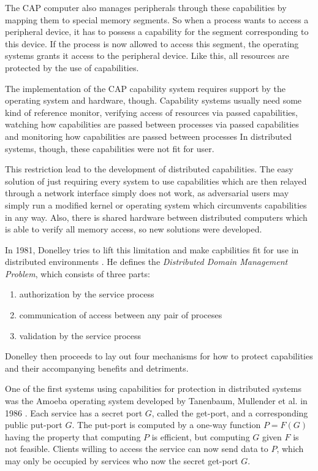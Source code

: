 The CAP computer also manages peripherals through these capabilities by mapping them to special memory segments.
So when a process wants to access a peripheral device, it has to possess a capability for the segment corresponding to this device.
If the process is now allowed to access this segment, the operating systems grants it access to the peripheral device.
Like this, all resources are protected by the use of capabilities.

The implementation of the CAP capability system requires support by the operating system and hardware, though.
Capability systems usually need some kind of reference monitor, verifying access of resources via passed capabilities, watching how capabilities are passed between processes via passed capabilities and monitoring how capabilities are passed between processes
In distributed systems, though, these capabilities were not fit for user.

This restriction lead to the development of distributed capabilities.
The easy solution of just requiring every system to use capabilities which are then relayed through a network interface simply does not work, as adversarial users may simply run a modified kernel or operating system which circumvents capabilities in any way.
Also, there is shared hardware between distributed computers which is able to verify all memory access, so new solutions were developed.

In 1981, Donelley tries to lift this limitation and make capbilities fit for use in distributed environments \cite{donnelley1981managing}.
He defines the \emph{Distributed Domain Management Problem}, which consists of three parts:
\begin{enumerate}
    \item authorization by the service process
    \item communication of access between any pair of proceses
    \item validation by the service process
\end{enumerate}
Donelley then proceeds to lay out four mechanisms for how to protect capabilities and their accompanying benefits and detriments.


One of the first systems using capabilities for protection in distributed systems was the Amoeba operating system developed by Tanenbaum, Mullender et al. in 1986 \cite{tanenbaum1986using,mullender1990amoeba}.
Each service has a secret port $G$, called the get-port, and a corresponding public put-port $G$.
The put-port is computed by a one-way function $P = F(G)$ having the property that computing $P$ is efficient, but computing $G$ given $F$ is not feasible.
Clients willing to access the service can now send data to $P$, which may only be occupied by services who now the secret get-port $G$.

